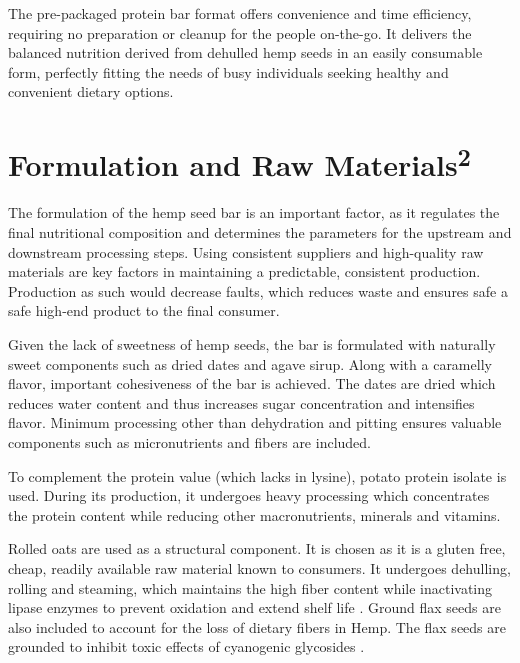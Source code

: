 \vspace{1em}
The pre-packaged protein bar format offers convenience and time efficiency, requiring no preparation or cleanup for the people on-the-go. It delivers the balanced nutrition derived from dehulled hemp seeds in an easily consumable form, perfectly fitting the needs of busy individuals seeking healthy and convenient dietary options.

\section{Formulation and Raw Materials\textsuperscript{2}}
The formulation of the hemp seed bar is an important factor, as it regulates the final nutritional composition and determines the parameters for the upstream and downstream processing steps. Using consistent suppliers and high-quality raw materials are key factors in maintaining a predictable, consistent production. Production as such would decrease faults, which reduces waste and ensures safe a safe high-end product to the final consumer. 

\vspace{1em}
Given the lack of sweetness of hemp seeds, the bar is formulated with naturally sweet components such as dried dates and agave sirup. Along with a caramelly flavor, important cohesiveness of the bar is achieved. The dates are dried which reduces water content and thus increases sugar concentration and intensifies flavor. Minimum processing other than dehydration and pitting ensures valuable components such as micronutrients and fibers are included.

\vspace{1em}
To complement the protein value (which lacks in lysine), potato protein isolate is used. During its production, it undergoes heavy processing which concentrates the protein content while reducing other macronutrients, minerals and vitamins\cite*{van2001effects}.

\vspace{1em}
Rolled oats are used as a structural component. It is chosen as it is a gluten free, cheap, readily available raw material known to consumers. It undergoes dehulling, rolling and steaming, which maintains the high fiber content while inactivating lipase enzymes to prevent oxidation and extend shelf life \cite*{Ekelund2024OatKilning}. Ground flax seeds are also included to account for the loss of dietary fibers in Hemp. The flax seeds are grounded to inhibit toxic effects of cyanogenic glycosides \cite*{Nowak2023FlaxseedHealth}.

